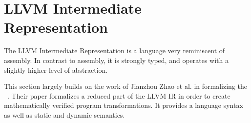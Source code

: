 


\clearpage
\section{LLVM Intermediate Representation}
\label{sec:llvmformalization}
The LLVM Intermediate Representation is a language very reminiscent of assembly.
In contrast to assembly, it is strongly typed, and operates with a slightly higher level of abstraction.

This section largely builds on the work of Jianzhou Zhao et al. in formalizing the \LLVMIR~\cite{Zhao:2012:FLI:2103656.2103709}.
Their paper formalizes a reduced part of the LLVM IR in order to create mathematically verified program transformations.
It provides a language syntax as well as static and dynamic semantics.

\newcommand{\kw}[1]{\text{\lsttext{#1}}}
